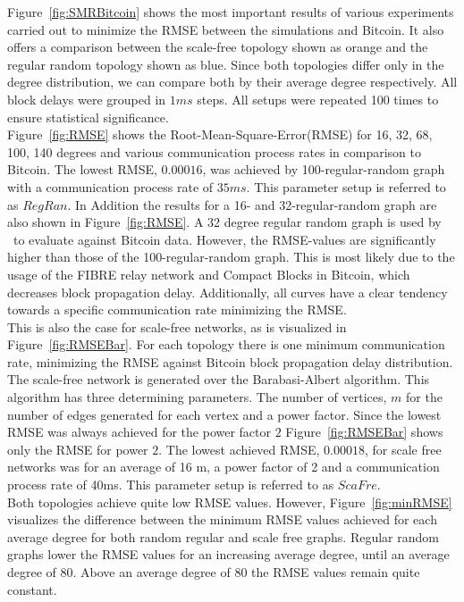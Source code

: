 Figure~\ref{fig:SMRBitcoin} shows the most important results of various experiments carried out to minimize the RMSE between the simulations and Bitcoin. It also offers a comparison between the scale-free topology shown as orange and the regular random topology shown as blue. Since both topologies differ only in the degree distribution, we can compare both by their average degree respectively. All block delays were grouped in $1ms$ steps. All setups were repeated 100 times to ensure statistical significance.\\
Figure~\ref{fig:RMSE} shows the Root-Mean-Square-Error(RMSE) for 16, 32, 68, 100, 140 degrees and various communication process rates in comparison to Bitcoin. The lowest RMSE, $0.00016$, was achieved by 100-regular-random graph with a communication process rate of $35ms$. This parameter setup is referred to as $RegRan$. 
In Addition the results for a 16- and 32-regular-random graph are also shown in Figure~\ref{fig:RMSE}. A 32 degree regular random graph is used by \gopalan ~to evaluate against Bitcoin data. However, the RMSE-values are significantly higher than those of the 100-regular-random graph. This is most likely due to the usage of the FIBRE relay network and Compact Blocks in Bitcoin, which decreases block propagation delay. Additionally, all curves have a clear tendency towards a specific communication rate minimizing the RMSE.\\
This is also the case for scale-free networks, as is visualized in Figure~\ref{fig:RMSEBar}. For each topology there is one minimum communication rate, minimizing the RMSE against Bitcoin block propagation delay distribution. The scale-free network is generated over the Barabasi-Albert algorithm. This algorithm has three determining parameters. The number of vertices, $m$ for the number of edges generated for each vertex and a power factor. Since the lowest RMSE was always achieved for the power factor $2$ Figure~\ref{fig:RMSEBar} shows only the RMSE for power $2$.
The lowest achieved RMSE, $0.00018$, for scale free networks was for an average of 16 m, a power factor of 2 and a communication process rate of 40ms. This parameter setup is referred to as $ScaFre$.\\
Both topologies achieve quite low RMSE values. However, Figure~\ref{fig:minRMSE} visualizes the difference between the minimum RMSE values achieved for each average degree for both random regular and scale free graphs.
Regular random graphs lower the RMSE values for an increasing average degree, until an average degree of 80. Above an average degree of 80 the RMSE values remain quite constant.\\
